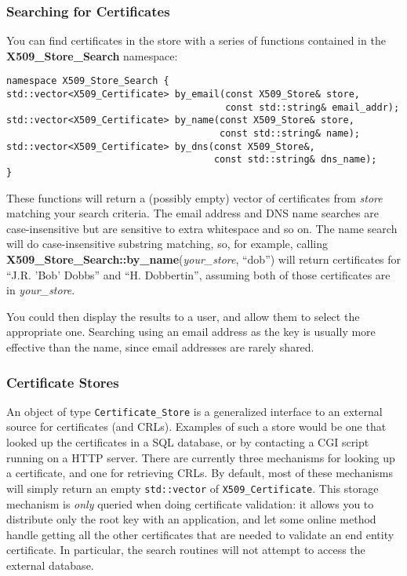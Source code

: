 \documentclass{article}
\newcommand{\function}[1]{\textbf{#1}}
\newcommand{\type}[1]{\texttt{#1}}
\renewcommand{\arg}[1]{\textsl{#1}}
\begin{document}
\subsubsection{Searching for Certificates}

You can find certificates in the store with a series of functions contained
in the \function{X509\_Store\_Search} namespace:

\begin{verbatim}
namespace X509_Store_Search {
std::vector<X509_Certificate> by_email(const X509_Store& store,
                                       const std::string& email_addr);
std::vector<X509_Certificate> by_name(const X509_Store& store,
                                      const std::string& name);
std::vector<X509_Certificate> by_dns(const X509_Store&,
                                     const std::string& dns_name);
}
\end{verbatim}

These functions will return a (possibly empty) vector of certificates from
\arg{store} matching your search criteria. The email address and DNS name
searches are case-insensitive but are sensitive to extra whitespace and so
on. The name search will do case-insensitive substring matching, so, for
example, calling \function{X509\_Store\_Search::by\_name}(\arg{your\_store},
``dob'') will return certificates for ``J.R. 'Bob' Dobbs'' and
``H. Dobbertin'', assuming both of those certificates are in \arg{your\_store}.

You could then display the results to a user, and allow them to select the
appropriate one. Searching using an email address as the key is usually more
effective than the name, since email addresses are rarely shared.

\subsubsection{Certificate Stores}

An object of type \type{Certificate\_Store} is a generalized interface to an
external source for certificates (and CRLs). Examples of such a store would be
one that looked up the certificates in a SQL database, or by contacting a CGI
script running on a HTTP server. There are currently three mechanisms for
looking up a certificate, and one for retrieving CRLs. By default, most of
these mechanisms will simply return an empty \type{std::vector} of
\type{X509\_Certificate}. This storage mechanism is \emph{only} queried when
doing certificate validation: it allows you to distribute only the root key
with an application, and let some online method handle getting all the other
certificates that are needed to validate an end entity certificate. In
particular, the search routines will not attempt to access the external
database.
\end{document}
